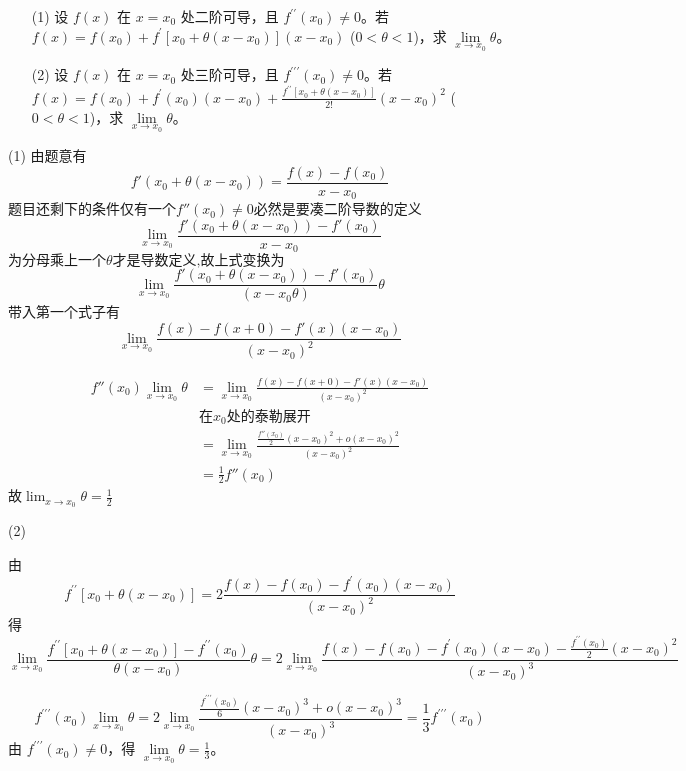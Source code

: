 \documentclass[12pt, a4paper, oneside, UTF8]{ctexbook}
\begin{document}
\begin{example}
\begin{enumerate}
    \item[(1)]设 $f(x)$ 在 $x=x_{0}$ 处二阶可导，且 $f^{\prime\prime}(x_{0})\neq 0$。若 $f(x)=f(x_{0})+f^{\prime}[x_{0}+\theta(x-x_{0})](x-x_{0})$ ($0<\theta<1$)，求 $\lim\limits_{x\to x_{0}}\theta$。
    \item[(2)]设 $f(x)$ 在 $x=x_{0}$ 处三阶可导，且 $f^{\prime\prime\prime}(x_{0})\neq 0$。若 $f(x)=f(x_{0})+f^{\prime}(x_{0})(x-x_{0})+\frac{f^{\prime\prime}[x_{0}+\theta(x-x_{0})]}{2!}(x-x_{0})^{2}$ ($0<\theta<1$)，求 $\lim\limits_{x\to x_{0}}\theta$。
\end{enumerate}
\end{example}
\begin{solution}
    \item[(1)]
    由题意有
    \[
    f'(x_0+\theta(x-x_0)) = \frac{f(x)-f(x_0)}{x-x_0} 
    \]
    题目还剩下的条件仅有一个$f''(x_0)\neq 0$必然是要凑二阶导数的定义
    \[
    \lim_{x\rightarrow x_0}\frac{f'(x_0+\theta(x-x_0)) - f'(x_0)}{x-x_0} 
    \]
    $\text{为分母乘上一个}\theta\text{才是导数定义,故上式变换为}$
    \[
    \lim_{x\rightarrow x_0}\frac{f'(x_0+\theta(x-x_0)) - f'(x_0)}{(x-x_0\theta)}\theta
    \]
    带入第一个式子有
    \[
    \lim_{x\rightarrow x_0}\frac{f(x)-f(x+0)-f'(x)(x-x_0)}{(x-x_0)^2}
    \]
    
    \begin{align*}
        f''(x_0)\lim_{x\rightarrow x_0}\theta 
        &= \lim_{x\rightarrow x_0}\frac{f(x)-f(x+0)-f'(x)(x-x_0)}{(x-x_0)^2} \\
        & \text{在}x_0\text{处的泰勒展开} \\
        &= \lim_{x\rightarrow x_0}\frac{\frac{f''(x_0)}{2}(x-x_0)^2+o(x-x_0)^2}{(x-x_0)^2} \\
        &= \frac{1}{2}f''(x_0)
    \end{align*}
    故$\lim_{x\rightarrow x_0}\theta = \frac{1}{2}$
    \item[(2)]
    
    由
    \[  
    f^{\prime\prime}\left[x_{0}+\theta\left(x-x_{0}\right)\right]=2\frac{f(x)-f\left(x_{0}\right)-f^{\prime}\left(x_{0}\right)\left(x-x_{0}\right)}{\left(x-x_{0}\right)^{2}}
    \]
    得
    \[
    \lim\limits_{x\to x_{0}}\frac{f^{\prime\prime}\left[x_{0}+\theta\left(x-x_{0}\right)\right]-f^{\prime\prime}\left(x_{0}\right)}{\theta\left(x-x_{0}\right)}\theta=2\lim\limits_{x\to x_{0}}\frac{f(x)-f\left(x_{0}\right)-f^{\prime}\left(x_{0}\right)\left(x-x_{0}\right)-\frac{f^{\prime\prime}\left(x_{0}\right)}{2}\left(x-x_{0}\right)^{2}}{\left(x-x_{0}\right)^{3}}
    \]

    \[
    f^{\prime\prime\prime}\left(x_{0}\right)\lim\limits_{x\to x_{0}}\theta=2\lim\limits_{x\to x_{0}}\frac{\frac{f^{\prime\prime\prime}\left(x_{0}\right)}{6}\left(x-x_{0}\right)^{3}+o\left(x-x_{0}\right)^{3}}{\left(x-x_{0}\right)^{3}}=\frac{1}{3} f^{\prime\prime\prime}\left(x_{0}\right)
    \]
    \newline
    由 $ f^{\prime\prime\prime}\left(x_{0}\right)\neq 0 $，得 $ \lim\limits_{x\to x_{0}}\theta=\frac{1}{3} $。
\end{solution}
\end{document}
